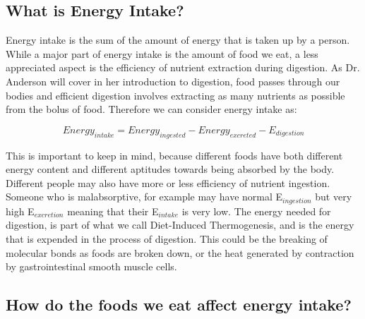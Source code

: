 \documentclass{tufte-handout}
\begin{document}
\subsection{What is Energy Intake?}
Energy intake is the sum of the amount of energy that is taken up by a person.  While a major part of energy intake is the amount of food we eat, a less appreciated aspect is the efficiency of nutrient extraction during digestion.  As Dr. Anderson will cover in her introduction to digestion, food passes through our bodies and efficient digestion involves extracting as many nutrients as possible from the bolus of food.  Therefore we can consider energy intake as:

\begin{equation}
Energy_{intake} = Energy_{ingested} - Energy_{excreted} - E_{digestion}
\end{equation}

This is important to keep in mind, because different foods have both different energy content and different aptitudes towards being absorbed by the body.  Different people may also have more or less efficiency of nutrient ingestion.  Someone who is malabsorptive, for example may have normal E$_{ingestion}$ but very high E$_{excretion}$ meaning that their E$_{intake}$ is very low.  The energy needed for digestion, is part of what we call Diet-Induced Thermogenesis, and is the energy that is expended in the process of digestion.  This could be the breaking of molecular bonds as foods are broken down, or the heat generated by contraction by gastrointestinal smooth muscle cells.

\subsection{How do the foods we eat affect energy intake?}
\end{document}

